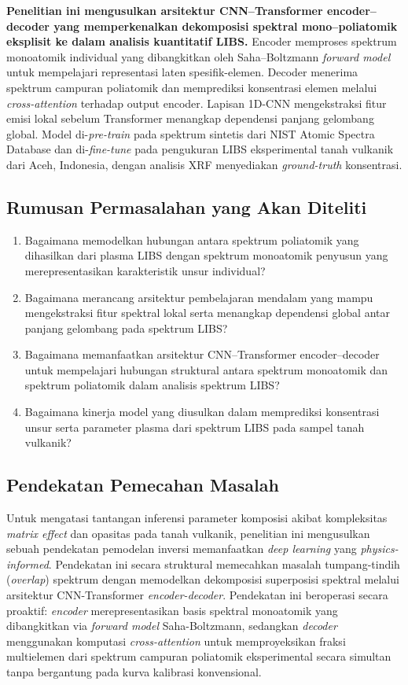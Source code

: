 \documentclass[12pt, a4paper]{article}
\begin{document}
\textbf{Penelitian ini mengusulkan arsitektur CNN–Transformer encoder–decoder yang memperkenalkan dekomposisi spektral mono–poliatomik eksplisit ke dalam analisis kuantitatif LIBS.} Encoder memproses spektrum monoatomik individual yang dibangkitkan oleh Saha–Boltzmann \textit{forward model} untuk mempelajari representasi laten spesifik-elemen. Decoder menerima spektrum campuran poliatomik dan memprediksi konsentrasi elemen melalui \textit{cross-attention} terhadap output encoder. Lapisan 1D-CNN mengekstraksi fitur emisi lokal sebelum Transformer menangkap dependensi panjang gelombang global. Model di-\textit{pre-train} pada spektrum sintetis dari NIST Atomic Spectra Database dan di-\textit{fine-tune} pada pengukuran LIBS eksperimental tanah vulkanik dari Aceh, Indonesia, dengan analisis XRF menyediakan \textit{ground-truth} konsentrasi.

\subsection{Rumusan Permasalahan yang Akan Diteliti}
\begin{enumerate}[label=\arabic*.]
    \item Bagaimana memodelkan hubungan antara spektrum poliatomik yang dihasilkan dari plasma LIBS dengan spektrum monoatomik penyusun yang merepresentasikan karakteristik unsur individual?
    \item Bagaimana merancang arsitektur pembelajaran mendalam yang mampu mengekstraksi fitur spektral lokal serta menangkap dependensi global antar panjang gelombang pada spektrum LIBS?
    \item Bagaimana memanfaatkan arsitektur CNN–Transformer encoder–decoder untuk mempelajari hubungan struktural antara spektrum monoatomik dan spektrum poliatomik dalam analisis spektrum LIBS?
    \item Bagaimana kinerja model yang diusulkan dalam memprediksi konsentrasi unsur serta parameter plasma dari spektrum LIBS pada sampel tanah vulkanik?
\end{enumerate}

\subsection{Pendekatan Pemecahan Masalah}
Untuk mengatasi tantangan inferensi parameter komposisi akibat kompleksitas \textit{matrix effect} dan opasitas pada tanah vulkanik, penelitian ini mengusulkan sebuah pendekatan pemodelan inversi memanfaatkan \textit{deep learning} yang \textit{physics-informed}. Pendekatan ini secara struktural memecahkan masalah tumpang-tindih (\textit{overlap}) spektrum dengan memodelkan dekomposisi superposisi spektral melalui arsitektur CNN-Transformer \textit{encoder-decoder}. Pendekatan ini beroperasi secara proaktif: \textit{encoder} merepresentasikan basis spektral monoatomik yang dibangkitkan via \textit{forward model} Saha-Boltzmann, sedangkan \textit{decoder} menggunakan komputasi \textit{cross-attention} untuk memproyeksikan fraksi multielemen dari spektrum campuran poliatomik eksperimental secara simultan tanpa bergantung pada kurva kalibrasi konvensional.
\end{document}

